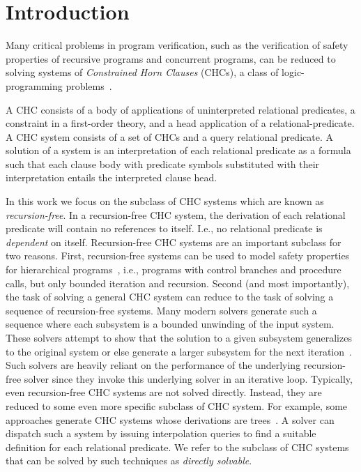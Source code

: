 \section{Introduction}
\label{sec:intro}
Many critical problems in program verification, such as the
verification of safety properties of recursive programs and
concurrent programs, can be reduced to solving systems of
\emph{Constrained Horn Clauses} (CHCs), a class of logic-programming
problems~\cite{bjorner13,flanagan03,rummer13a,rummer13b}.


A CHC consists of a body of applications of uninterpreted relational
predicates, a constraint in a first-order theory, and a head
application of a relational-predicate.
%
A CHC system consists of a set of CHCs and a query relational
predicate.
% 
A solution of a system is an interpretation of each relational
predicate as a formula such that each clause body with predicate
symbols substituted with their interpretation entails the interpreted
clause head.

In this work we focus on the subclass of CHC systems which are known
as \emph{recursion-free}. In a recursion-free CHC system, the
derivation of each relational predicate will contain no references to
itself.  I.e., no
relational predicate is \emph{dependent} on itself.
%
Recursion-free CHC systems are an important subclass for two reasons.
%
First, recursion-free systems can be used to model safety properties
for hierarchical programs~\cite{lal-qadeer15,lal-qadeer-lahiri12},
i.e., programs with control branches and procedure calls, but only
bounded iteration and recursion.
%
Second (and most importantly), the task of solving a general CHC
system can reduce to the task of solving a sequence of recursion-free
systems.
%
Many  modern solvers generate
such a sequence where each subsystem is a bounded unwinding of the
input system. These solvers attempt to show that the solution to a
given subsystem generalizes to the original system or else generate a
larger subsystem for the next iteration~\cite{bjorner13}.
%
Such solvers are heavily reliant on the performance of the underlying
recursion-free solver since they invoke this underlying solver in an
iterative loop.
%
Typically, even recursion-free CHC systems are not solved directly.
Instead, they are reduced to some even more specific subclass of CHC
system. For example, some approaches generate CHC systems whose
derivations are trees~\cite{bjorner13}.
%
A solver can dispatch such a system by issuing interpolation queries
to find a suitable definition for each relational predicate.
%
We refer to the subclass of CHC systems that can be solved by such
techniques as \emph{directly solvable}.

